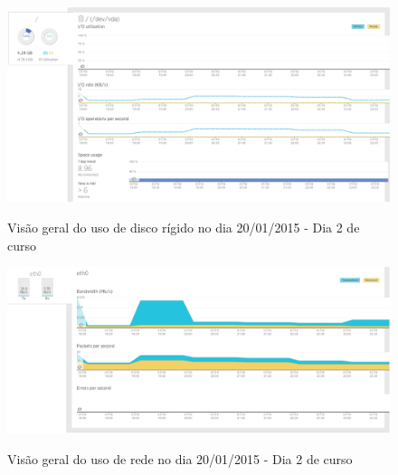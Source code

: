 \documentclass[
	12pt,				%
	oneside,			%
	a4paper,			%
	english,			%
	brazil				%
	]{abntex2ppgsi}
\begin{document}
\begin{apendicesenv}
\begin{figure}[h]
\centering
\caption{Visão geral do uso de disco rígido no dia 20/01/2015 - Dia 2 de curso}
\includegraphics[width=1.0\textwidth]{relatorios/20-01-15/disk_cropped.pdf} 
\label{fig:recursos_dia2_2} 
\end{figure}

\begin{figure}[h]
\centering
\caption{Visão geral do uso de rede no dia 20/01/2015 - Dia 2 de curso}
\includegraphics[width=1.0\textwidth]{relatorios/20-01-15/network_cropped.pdf} 
\label{fig:recursos_dia2_3} 
\end{figure}


\end{apendicesenv}
\end{document}
